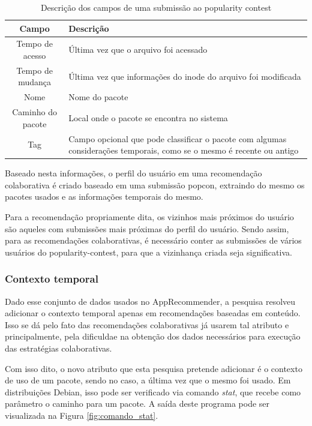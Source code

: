 \begin{table}[h!]
\centering
\newcommand\T{\rule{0pt}{2.8ex}}
\newcommand\B{\rule[-1.8ex]{0pt}{0pt}}
\begin{tabularx}{15cm}{| c | X |}
\hline
\rowcolor[HTML]{EFEFEF}
{\textbf{Campo}} & \textbf{Descrição} \\ \hline
{Tempo de acesso}  & Última vez que o arquivo foi acessado \\ \hline
{Tempo de mudança}   & Última vez que informações do inode do arquivo foi
                       modificada\\ \hline
{Nome}   & Nome do pacote                  \\ \hline
{Caminho do pacote}   & Local onde o pacote se encontra no sistema \\ \hline
{Tag}   & Campo opcional que pode classificar o pacote com algumas considerações
temporais, como se o mesmo é recente ou antigo\\ \hline
\end{tabularx}
\caption{Descrição dos campos de uma submissão ao popularity contest}
\label{tab:submissao_popcon}
\end{table}

Baseado nesta informações, o perfil do usuário em uma recomendação colaborativa
é criado baseado em uma submissão popcon, extraindo do mesmo os pacotes usados e
as informações temporais do mesmo.

Para a recomendação propriamente dita, os vizinhos mais próximos do usuário são
aqueles com submissões mais próximas do perfil do usuário. Sendo assim, para as
recomendações colaborativas, é necessário conter as submissões de vários
usuários do popularity-contest, para que a vizinhança criada seja significativa.

\subsubsection{Contexto temporal} \label{sec:contexto_temporal}

Dado esse conjunto de dados usados no AppRecommender, a pesquisa resolveu
adicionar o contexto temporal apenas em recomendações baseadas em conteúdo. Isso
se dá pelo fato das recomendações colaborativas já usarem tal atributo e
principalmente, pela dificuldae na obtenção dos dados necessários para execução
das estratégias colaborativas.

Com isso dito, o novo atributo que esta pesquisa pretende
adicionar é o contexto de uso de um pacote, sendo no caso, a última vez que o
mesmo foi usado. Em distribuições Debian, isso pode ser verificado via comando
\textit{stat}, que recebe como parâmetro o caminho para um pacote.
A saída deste programa pode ser visualizada na Figura \ref{fig:comando_stat}.

